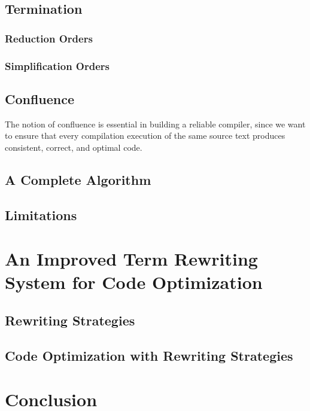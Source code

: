 \documentclass{article}
\begin{document}


\subsection{Termination}
\subsubsection{Reduction Orders}
\subsubsection{Simplification Orders}
\subsection{Confluence}
The notion of confluence is essential in building a reliable compiler, since we want to ensure that every
compilation execution of the same source text produces consistent, correct, and optimal code.
\subsection{A Complete Algorithm}
\subsection{Limitations}
\section{An Improved Term Rewriting System for Code Optimization} %
\subsection{Rewriting Strategies}
\subsection{Code Optimization with Rewriting Strategies}
\section{Conclusion}


\pagebreak
\nocite{*} %
\printbibliography %
\end{document}
